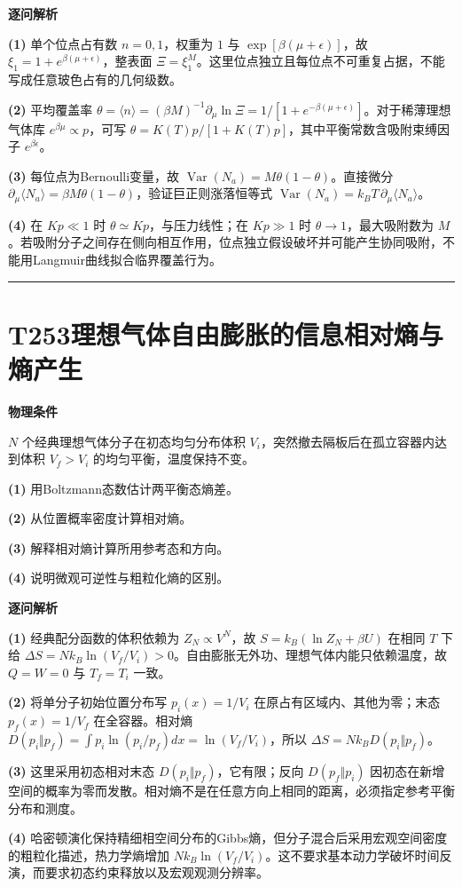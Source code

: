 \documentclass[UTF8,a4paper,11pt,oneside,openany]{ctexbook}
\begin{document}
\par\medskip\noindent\textbf{逐问解析}
\par\noindent\textbf{(1)} 单个位点占有数 \(n=0,1\)，权重为 \(1\) 与 \(\exp[\beta(\mu+\epsilon)]\)，故 \(\xi_1=1+e^{\beta(\mu+\epsilon)}\)，整表面 \(\Xi=\xi_1^M\)。这里位点独立且每位点不可重复占据，不能写成任意玻色占有的几何级数。
\par\noindent\textbf{(2)} 平均覆盖率 \(\theta=\langle n\rangle=(\beta M)^{-1}\partial_\mu\ln\Xi=1/[1+e^{-\beta(\mu+\epsilon)}]\)。对于稀薄理想气体库 \(e^{\beta\mu}\propto p\)，可写 \(\theta=K(T)p/[1+K(T)p]\)，其中平衡常数含吸附束缚因子 \(e^{\beta\epsilon}\)。
\par\noindent\textbf{(3)} 每位点为Bernoulli变量，故 \(\operatorname{Var}(N_a)=M\theta(1-\theta)\)。直接微分 \(\partial_\mu\langle N_a\rangle=\beta M\theta(1-\theta)\)，验证巨正则涨落恒等式 \(\operatorname{Var}(N_a)=k_BT\,\partial_\mu\langle N_a\rangle\)。
\par\noindent\textbf{(4)} 在 \(Kp\ll1\) 时 \(\theta\simeq Kp\)，与压力线性；在 \(Kp\gg1\) 时 \(\theta\to1\)，最大吸附数为 \(M\)。若吸附分子之间存在侧向相互作用，位点独立假设破坏并可能产生协同吸附，不能用Langmuir曲线拟合临界覆盖行为。

\par\bigskip\hrule\bigskip
\section*{T253\quad 理想气体自由膨胀的信息相对熵与熵产生}
\textbf{物理条件}\par \(N\) 个经典理想气体分子在初态均匀分布体积 \(V_i\)，突然撤去隔板后在孤立容器内达到体积 \(V_f>V_i\) 的均匀平衡，温度保持不变。
\par\noindent\textbf{(1)} 用Boltzmann态数估计两平衡态熵差。
\par\noindent\textbf{(2)} 从位置概率密度计算相对熵。
\par\noindent\textbf{(3)} 解释相对熵计算所用参考态和方向。
\par\noindent\textbf{(4)} 说明微观可逆性与粗粒化熵的区别。

\par\medskip\noindent\textbf{逐问解析}
\par\noindent\textbf{(1)} 经典配分函数的体积依赖为 \(Z_N\propto V^N\)，故 \(S=k_B(\ln Z_N+\beta U)\) 在相同 \(T\) 下给 \(\Delta S=Nk_B\ln(V_f/V_i)>0\)。自由膨胀无外功、理想气体内能只依赖温度，故 \(Q=W=0\) 与 \(T_f=T_i\) 一致。
\par\noindent\textbf{(2)} 将单分子初始位置分布写 \(p_i(x)=1/V_i\) 在原占有区域内、其他为零；末态 \(p_f(x)=1/V_f\) 在全容器。相对熵 \(D(p_i\Vert p_f)=\int p_i\ln(p_i/p_f)dx=\ln(V_f/V_i)\)，所以 \(\Delta S=Nk_B D(p_i\Vert p_f)\)。
\par\noindent\textbf{(3)} 这里采用初态相对末态 \(D(p_i\Vert p_f)\)，它有限；反向 \(D(p_f\Vert p_i)\) 因初态在新增空间的概率为零而发散。相对熵不是在任意方向上相同的距离，必须指定参考平衡分布和测度。
\par\noindent\textbf{(4)} 哈密顿演化保持精细相空间分布的Gibbs熵，但分子混合后采用宏观空间密度的粗粒化描述，热力学熵增加 \(Nk_B\ln(V_f/V_i)\)。这不要求基本动力学破坏时间反演，而要求初态约束释放以及宏观观测分辨率。
\end{document}
